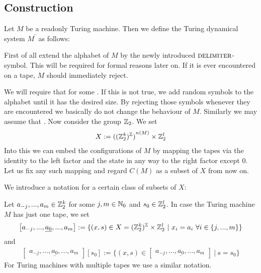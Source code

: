 \subsection{Construction}
\label{tm_to_tds:construction}

Let $M$ be a readonly Turing machine.
Then we define the Turing dynamical system $M^\prime$ as follows:

First of all extend the alphabet of $M$ by the newly introduced $\text{\scshape{delimiter}}$-symbol. This will be required for formal reasons later on. If it is ever encountered on a tape, $M$ should immediately reject.

We will require that  for some .
If this is not true, we add random symbols to the alphabet until it has the desired size. By rejecting those symbols whenever they are encountered we basically do not change the behaviour of $M$.
Similarly we may assume that .
Now consider the group $\mathbb{Z}_2$.
We set
\begin{align*}
	X := {{((\mathbb{Z}_2^{k})^{\mathbb{Z}})}^{n(M)}} \times \mathbb{Z}_2^l
\end{align*}
Into this we can embed the configurations of $M$ by mapping the tapes via the identity to the left factor and the state in any way to the right factor except $0$.
Let us fix any such mapping and regard $C(M)$ as a subset of $X$ from now on.

\begin{Notation}
	We introduce a notation for a certain class of subsets of $X$:
	
	Let $a_{-j},...,a_{m} \in \mathbb{Z}_2^k$ for some $j, m \in \mathbb{N}_0$ and $s_0 \in \mathbb{Z}_2^l$. In case the Turing machine $M$ has just one tape, we set
	\begin{align*}
		\begin{bmatrix}
			a_{-j},...,\underline{a_0},...,a_m
		\end{bmatrix} := \{ (x,s) \in X = (\mathbb{Z}_2^k)^{\mathbb{Z}} \times \mathbb{Z}_2^l ~|~ x_i = a_i ~\forall i \in \{j,...,m\}\} 
	\end{align*}
	and
	\begin{align*}
		\begin{bmatrix}
			a_{-j},...,\underline{a_0},...,a_m
		\end{bmatrix} [ s_0 ] := \{ (x,s) \in \begin{bmatrix} a_{-j},...,\underline{a_0},...,a_m \end{bmatrix} ~|~ s = s_0 \}
	\end{align*}
	For Turing machines with multiple tapes we use a similar notation.
\end{Notation}

